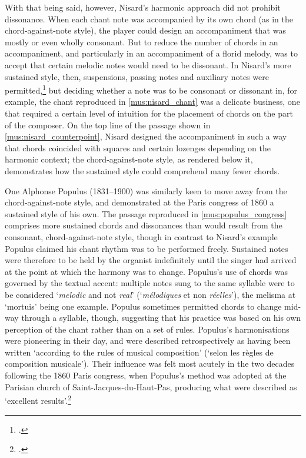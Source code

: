 %
With that being said, however, Nisard's harmonic approach did not prohibit dissonance.
When each chant note was accompanied by its own chord (as in the chord-against-note style), the player could design an accompaniment that was mostly or even wholly consonant.
But to reduce the number of chords in an accompaniment, and particularly in an accompaniment of a florid melody, was to accept that certain melodic notes would need to be dissonant.
In Nisard's more sustained style, then, suspensions, passing notes and auxiliary notes were permitted,\footcite[40, 44--5]{Nisardvraisprincipesaccompagnement1860} but deciding whether a note was to be consonant or dissonant in, for example, the chant reproduced in \cref{mus:nisard_chant} was a delicate business, one that required a certain level of intuition for the placement of chords on the part of the composer.
On the top line of the passage shown in \cref{mus:nisard_counterpoint}, Nisard designed the accompaniment in such a way that chords coincided with squares and certain lozenges depending on the harmonic context; the chord-against-note style, as rendered below it, demonstrates how the sustained style could comprehend many fewer chords.

%
One Alphonse Populus (1831--1900) was similarly keen to move away from the chord-against-note style, and demonstrated at the Paris congress of 1860 a sustained style of his own.
The passage reproduced in \cref{mus:populus_congress} comprises more sustained chords and dissonances than would result from the consonant, chord-against-note style, though in contrast to Nisard's example Populus claimed his chant rhythm was to be performed freely.
Sustained notes were therefore to be held by the organist indefinitely until the singer had arrived at the point at which the harmony was to change.
Populus's use of chords was governed by the textual accent: multiple notes sung to the same syllable were to be considered `\emph{melodic} and not \emph{real}' (`\emph{mélodiques} et non \emph{réelles}'), the melisma at `mortuis' being one example.
Populus sometimes permitted chords to change mid-way through a syllable, though, suggesting that his practice was based on his own perception of the chant rather than on a set of rules.
Populus's harmonisations were pioneering in their day, and were described retrospectively as having been written `according to the rules of musical composition' (`selon les règles de composition musicale').
Their influence was felt most acutely in the two decades following the 1860 Paris congress, when Populus's method was adopted at the Parisian church of Saint-Jacques-du-Haut-Pas, producing what were described as `excellent results'.\footcite[p.~9 \S{}11 and n.~2]{RuellecongreseuropeenArezzo1884}


